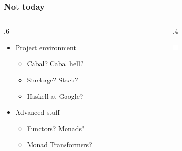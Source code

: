 \documentclass[17pt]{beamer}
\renewcommand{\(}[1]{\begin{columns}[#1]}
\renewcommand{\)}{\end{columns}}
\newcommand{\<}[1]{\begin{column}{#1}}
\renewcommand{\>}{\end{column}}
\begin{document}
\begin{frame}
  \frametitle{Not today}
  \({c}
  \<{.6\textwidth}
  \begin{center}
  \begin{itemize}
  \item Project environment
    \begin{itemize}
    \item Cabal? Cabal hell?
    \item Stackage? Stack?
    \item Haskell at Google?
    \end{itemize}
  \end{itemize}
  \begin{itemize}
  \item Advanced stuff
    \begin{itemize}
    \item Functors? Monads?
    \item Monad Transformers?
    \end{itemize}
  \end{itemize}
  \end{center}
  \>
  \<{.4\textwidth}
  \begin{center}
    \includegraphics[width=.8\textwidth]{img/replace_me_with_anything_you_want}
  \end{center}
  \>
  \)
\end{frame}
\end{document}

